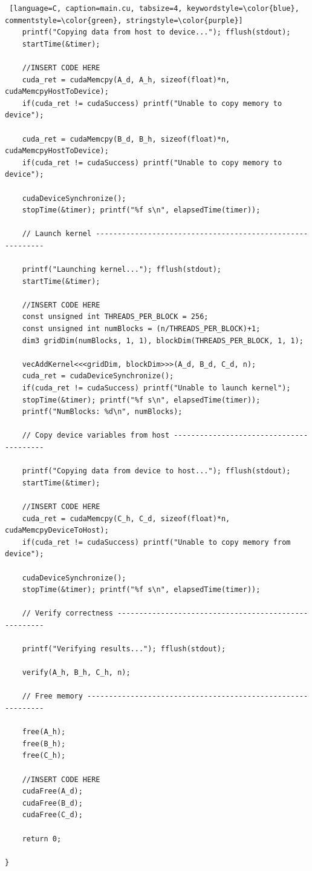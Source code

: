 \documentclass{article}
\begin{document}
\begin{lstlisting} [language=C, caption=main.cu, tabsize=4, keywordstyle=\color{blue}, commentstyle=\color{green}, stringstyle=\color{purple}]
	printf("Copying data from host to device..."); fflush(stdout);
	startTime(&timer);
	
	//INSERT CODE HERE
	cuda_ret = cudaMemcpy(A_d, A_h, sizeof(float)*n, cudaMemcpyHostToDevice);
	if(cuda_ret != cudaSuccess) printf("Unable to copy memory to device");
	
	cuda_ret = cudaMemcpy(B_d, B_h, sizeof(float)*n, cudaMemcpyHostToDevice);
	if(cuda_ret != cudaSuccess) printf("Unable to copy memory to device");
	
	cudaDeviceSynchronize();
	stopTime(&timer); printf("%f s\n", elapsedTime(timer));
	
	// Launch kernel ----------------------------------------------------------
	
	printf("Launching kernel..."); fflush(stdout);
	startTime(&timer);
	
	//INSERT CODE HERE
	const unsigned int THREADS_PER_BLOCK = 256;
	const unsigned int numBlocks = (n/THREADS_PER_BLOCK)+1;
	dim3 gridDim(numBlocks, 1, 1), blockDim(THREADS_PER_BLOCK, 1, 1);
	
	vecAddKernel<<<gridDim, blockDim>>>(A_d, B_d, C_d, n);
	cuda_ret = cudaDeviceSynchronize();
	if(cuda_ret != cudaSuccess) printf("Unable to launch kernel");
	stopTime(&timer); printf("%f s\n", elapsedTime(timer));
	printf("NumBlocks: %d\n", numBlocks);
	
	// Copy device variables from host ----------------------------------------
	
	printf("Copying data from device to host..."); fflush(stdout);
	startTime(&timer);
	
	//INSERT CODE HERE
	cuda_ret = cudaMemcpy(C_h, C_d, sizeof(float)*n, cudaMemcpyDeviceToHost);
	if(cuda_ret != cudaSuccess) printf("Unable to copy memory from device");
	
	cudaDeviceSynchronize();
	stopTime(&timer); printf("%f s\n", elapsedTime(timer));
	
	// Verify correctness -----------------------------------------------------
	
	printf("Verifying results..."); fflush(stdout);
	
	verify(A_h, B_h, C_h, n);
	
	// Free memory ------------------------------------------------------------
	
	free(A_h);
	free(B_h);
	free(C_h);
	
	//INSERT CODE HERE
	cudaFree(A_d);
	cudaFree(B_d);
	cudaFree(C_d);
	
	return 0;
	
}
\end{lstlisting}
\end{document}

